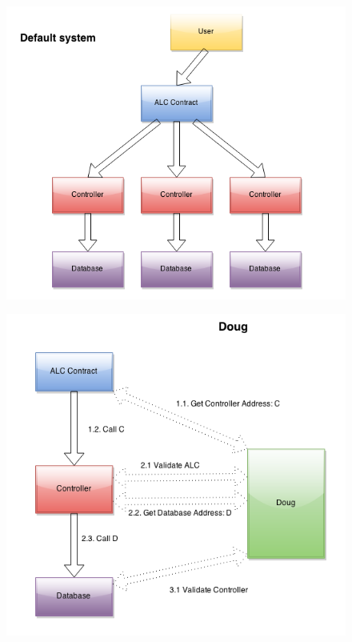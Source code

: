 \begin{figure}
\centering
\includegraphics[width=\textwidth]{Figures/FiveTypesSystem}
\decoRule
\caption[]{}
\label{fig:FiveTypesSystem}
\end{figure}

\begin{figure}
\centering
\includegraphics[width=\textwidth]{Figures/FiveTypesDOUG}
\decoRule
\caption[]{}
\label{fig:FiveTypesDOUG}
\end{figure}

